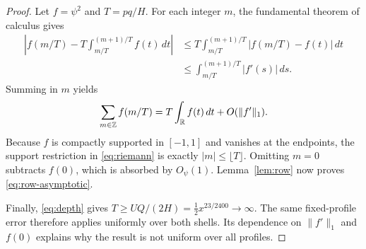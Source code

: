 \begin{proof}
Let $f=\psi^2$ and $T=pq/H$.  For each integer $m$, the fundamental theorem
of calculus gives
\begin{align*}
 \left|f(m/T)-T\int_{m/T}^{(m+1)/T}f(t)\,dt\right|
 &\leq T\int_{m/T}^{(m+1)/T}|f(m/T)-f(t)|\,dt\\
 &\leq\int_{m/T}^{(m+1)/T}|f'(s)|\,ds.
\end{align*}
Summing in $m$ yields
\begin{equation}
 \sum_{m\in\mathbb{Z}}f(m/T)=T\int_{\mathbb{R}}f(t)\,dt+O(\|f'\|_1).
 \label{eq:riemann}
\end{equation}
Because $f$ is compactly supported in $[-1,1]$ and vanishes at the endpoints,
the support restriction in \eqref{eq:riemann} is exactly
$|m|\leq\lfloor T\rfloor$.  Omitting $m=0$ subtracts $f(0)$, which is
absorbed by $O_\psi(1)$.  Lemma~\ref{lem:row} now proves
\eqref{eq:row-asymptotic}.

Finally, \eqref{eq:depth} gives
$T\geq UQ/(2H)=\tfrac12x^{23/2400}\to\infty$.  The same fixed-profile
error therefore applies uniformly over both shells.  Its dependence on
$\|f'\|_1$ and $f(0)$ explains why the result is not uniform over all profiles.
\end{proof}
